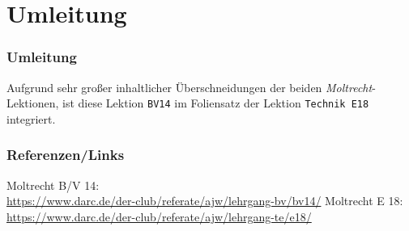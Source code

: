 

\subtitle{Betriebstechnik/Vorschriften 14: \\
          Störungen, EMV und EMVU, Sicherheit \\[2em]}
\date{Stand 18.09.2017}


\section{Umleitung}

\begin{frame}
    \frametitle{Umleitung}

    Aufgrund sehr großer inhaltlicher Überschneidungen der beiden
    \emph{Moltrecht}-Lektionen, ist diese Lektion
    \texttt{BV14}\hyperlink{refs}{\cite{bv14}} im Foliensatz der Lektion
    \texttt{Technik E18}\hyperlink{refs}{\cite{e18}} integriert.

\end{frame}

\renewcommand{\refname}{Referenzen}

\begin{frame}
    \frametitle{Referenzen/Links}
    \hypertarget{refs}{}
    \footnotesize

    \begin{thebibliography}{}
          Moltrecht B/V 14: \\
                        \url{https://www.darc.de/der-club/referate/ajw/lehrgang-bv/bv14/}
           Moltrecht E 18: \\
                        \url{https://www.darc.de/der-club/referate/ajw/lehrgang-te/e18/}
    \end{thebibliography} 
   
\end{frame}


